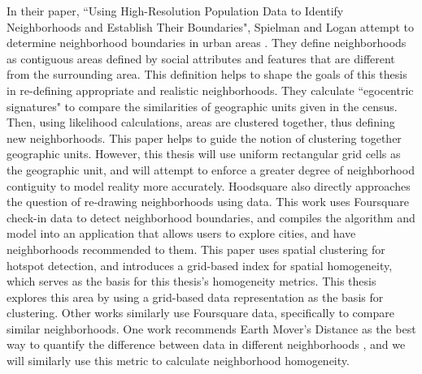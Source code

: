 \documentclass[times new roman,12pt]{article}
\begin{document}
In their paper, ``Using High-Resolution Population Data to Identify Neighborhoods and Establish Their Boundaries", Spielman and Logan attempt to determine neighborhood boundaries in urban areas \cite{SpielmanSethE.2012UHPD}. They define neighborhoods as contiguous areas defined by social attributes and features that are different from the surrounding area. This definition helps to shape the goals of this thesis in re-defining appropriate and realistic neighborhoods. They calculate ``egocentric signatures" to compare the similarities of geographic units given in the census. Then, using likelihood calculations, areas are clustered together, thus defining new neighborhoods. This paper helps to guide the notion of clustering together geographic units. However, this thesis will use uniform rectangular grid cells as the geographic unit, and will attempt to enforce a greater degree of neighborhood contiguity to model reality more accurately. Hoodsquare \cite{zhang2013hoodsquare} also directly approaches the question of re-drawing neighborhoods using data. This work uses Foursquare check-in data to detect neighborhood boundaries, and compiles the algorithm and model into an application that allows users to explore cities, and have neighborhoods recommended to them. This paper uses spatial clustering for hotspot detection, and introduces a grid-based index for spatial homogeneity, which serves as the basis for this thesis's homogeneity metrics. This thesis explores this area by using a grid-based data representation as the basis for clustering. Other works similarly use Foursquare data, specifically to compare similar neighborhoods. One work recommends Earth Mover's Distance as the best way to quantify the difference between data in different neighborhoods \cite{le2015soho}, and we will similarly use this metric to calculate neighborhood homogeneity. 

\end{document}
